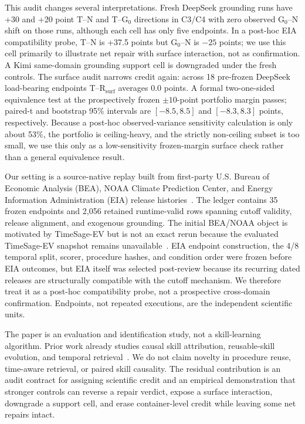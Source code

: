 This audit changes several interpretations. Fresh DeepSeek grounding runs have +30 and +20 point T--N and T--G$_0$ directions in C3/C4 with zero observed G$_0$--N shift on those runs, although each cell has only five endpoints. In a post-hoc EIA compatibility probe, T--N is +37.5 points but G$_0$--N is $-25$ points; we use this cell primarily to illustrate net repair with surface interaction, not as confirmation. A Kimi same-domain grounding support cell is downgraded under the fresh controls. The surface audit narrows credit again: across 18 pre-frozen DeepSeek load-bearing endpoints T--R$_{\mathrm{surf}}$ averages 0.0 points. A formal two-one-sided equivalence test at the prospectively frozen $\pm10$-point portfolio margin passes; paired-t and bootstrap 95\% intervals are $[-8.5,8.5]$ and $[-8.3,8.3]$ points, respectively. Because a post-hoc observed-variance sensitivity calculation is only about 53\%, the portfolio is ceiling-heavy, and the strictly non-ceiling subset is too small, we use this only as a low-sensitivity frozen-margin surface check rather than a general equivalence result.

Our setting is a source-native replay built from first-party U.S. Bureau of Economic Analysis (BEA), NOAA Climate Prediction Center, and Energy Information Administration (EIA) release histories~\citep{bea2026archive,noaa2026enso,eia2026wpsrarchive}. The ledger contains 35 frozen endpoints and 2,056 retained runtime-valid rows spanning cutoff validity, release alignment, and exogenous grounding. The initial BEA/NOAA object is motivated by TimeSage-EV but is not an exact rerun because the evaluated TimeSage-EV snapshot remains unavailable~\citep{yao2026timesage}. EIA endpoint construction, the 4/8 temporal split, scorer, procedure hashes, and condition order were frozen before EIA outcomes, but EIA itself was selected post-review because its recurring dated releases are structurally compatible with the cutoff mechanism. We therefore treat it as a post-hoc compatibility probe, not a prospective cross-domain confirmation. Endpoints, not repeated executions, are the independent scientific units.

The paper is an evaluation and identification study, not a skill-learning algorithm. Prior work already studies causal skill attribution, reusable-skill evolution, and temporal retrieval~\citep{zhou2026counterfactual,dong2026agentskills,wang2026notallskills,guan2026continualskillbench,wei2026evoharness,zheng2026skillprox,xu2026hyperskill,asai2024selfrag,yan2024crag,han2025temporalgraphs,wang2026iarag}. We do not claim novelty in procedure reuse, time-aware retrieval, or paired skill causality. The residual contribution is an audit contract for assigning scientific credit and an empirical demonstration that stronger controls can reverse a repair verdict, expose a surface interaction, downgrade a support cell, and erase container-level credit while leaving some net repairs intact.


